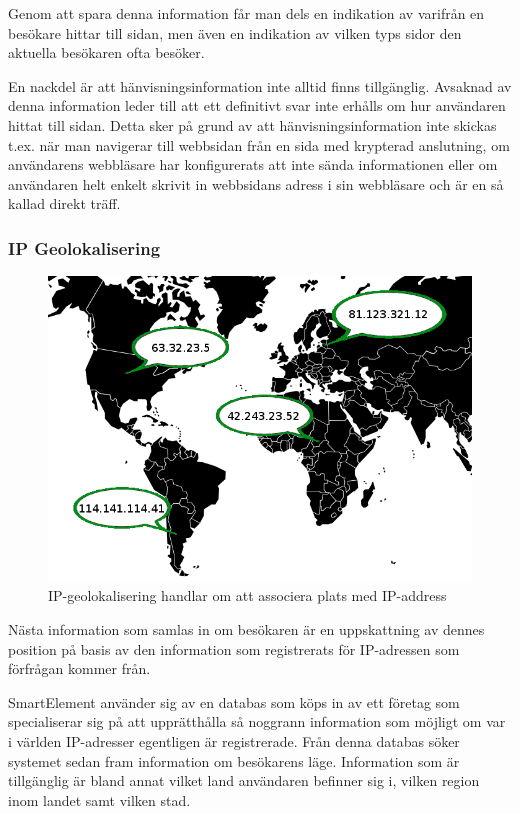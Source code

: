 Genom att spara denna information får man dels en indikation av varifrån en besökare hittar till sidan, men även en indikation av vilken typs sidor den aktuella besökaren ofta besöker.

En nackdel är att hänvisningsinformation inte alltid finns tillgänglig. Avsaknad av denna information leder till att ett definitivt svar inte erhålls om hur användaren hittat till sidan. Detta sker på grund av att hänvisningsinformation inte skickas t.ex. när man navigerar till webbsidan från en sida med krypterad anslutning, om användarens webbläsare har konfigurerats att inte sända informationen eller om användaren helt enkelt skrivit in webbsidans adress i sin webbläsare och är en så kallad direkt träff. \citep{httprfc}

\subsubsection{IP Geolokalisering}

\begin{figure}[h!]
\centering
\includegraphics[width=120mm]{assets/images/geolocation.png}
\caption{IP-geolokalisering handlar om att associera plats med IP-address}
\label{geolocation}
\end{figure}

Nästa information som samlas in om besökaren är en uppskattning av dennes position på basis av den information som registrerats för IP-adressen som förfrågan kommer från.

SmartElement använder sig av en databas som köps in av ett företag som specialiserar sig på att upprätthålla så noggrann information som möjligt om var i världen IP-adresser egentligen är registrerade. Från denna databas söker systemet sedan fram information om besökarens läge. Information som är tillgänglig är bland annat vilket land användaren befinner sig i, vilken region inom landet samt vilken stad.

